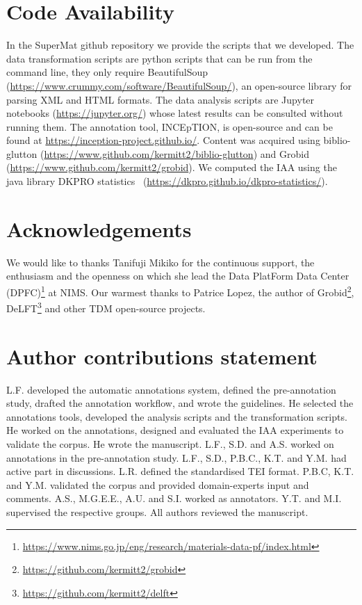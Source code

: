 \documentclass[fleqn,10pt]{wlscirep}
\begin{document}
\section*{Code Availability}
\label{sec:code-availability}
In the SuperMat github repository we provide the scripts that we developed. The data transformation scripts are python scripts that can be run from the command line, they only require BeautifulSoup (\url{https://www.crummy.com/software/BeautifulSoup/}), an open-source library for parsing XML and HTML formats. The data analysis scripts are Jupyter notebooks (\url{https://jupyter.org/}) whose latest results can be consulted without running them. 
The annotation tool, INCEpTION, is open-source and can be found at \url{https://inception-project.github.io/}. 
Content was acquired using biblio-glutton (\url{https://www.github.com/kermitt2/biblio-glutton}) and Grobid (\url{https://www.github.com/kermitt2/grobid}).
We computed the IAA using the java library DKPRO statistics~\cite{Meyer2014DKProAA} (\url{https://dkpro.github.io/dkpro-statistics/}).

  

\section*{Acknowledgements}

We would like to thanks Tanifuji Mikiko for the continuous support, the enthusiasm and the openness on which she lead the Data PlatForm Data Center (DPFC)\footnote{\url{https://www.nims.go.jp/eng/research/materials-data-pf/index.html}} at NIMS.
Our warmest thanks to Patrice Lopez, the author of Grobid\footnote{\url{https://github.com/kermitt2/grobid}}, DeLFT\footnote{\url{https://github.com/kermitt2/delft}} and other TDM open-source projects. 

\section*{Author contributions statement}

L.F. developed the automatic annotations system, defined the pre-annotation study, drafted the annotation workflow, and wrote the guidelines. 
He selected the annotations tools, developed the analysis scripts and the transformation scripts. 
He worked on the annotations, designed and evaluated the IAA experiments to validate the corpus. 
He wrote the manuscript.
L.F., S.D. and A.S. worked on annotations in the pre-annotation study. 
L.F., S.D., P.B.C., K.T. and Y.M. had active part in discussions.
L.R. defined the standardised TEI format.
P.B.C, K.T. and Y.M. validated the corpus and provided domain-experts input and comments.
A.S., M.G.E.E., A.U. and S.I. worked as annotators. 
Y.T. and M.I. supervised the respective groups. 
All authors reviewed the manuscript. 
\end{document}
